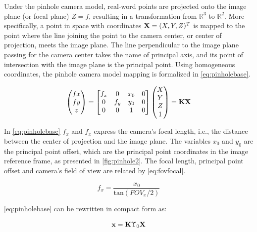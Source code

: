 Under the pinhole camera model, real-word points are projected onto the image plane (or focal plane) $Z = f$, resulting in a transformation from $\mathbb{R}^3$ to $\mathbb{R}^2$. More specifically, a point in space with coordinates $\mathrm{\textbf{X}} = (X,Y,Z)^T$ is mapped to the point where the line joining the point to the camera center, or center of projection, meets the image plane. The line perpendicular to the image plane passing for the camera center takes the name of principal axis, and its point of intersection with the image plane is the principal point. Using homogeneous coordinates, the pinhole camera model mapping is formalized in \cref{eq:pinholebase}.

\begin{equation}
\label{eq:pinholebase}
    \begin{pmatrix}
        fx\\
        fy\\
        z
    \end{pmatrix}=\begin{bmatrix}
    f_x & 0 & x_0 & 0 \\ 0 & f_y & y_0 & 0 \\ 0 & 0 & 1 & 0
    \end{bmatrix}\begin{pmatrix}
        X \\ Y \\ Z \\ 1
    \end{pmatrix} = \mathrm{\textbf{K}}\mathrm{\textbf{X}}
\end{equation}

In \cref{eq:pinholebase} $f_x$ and $f_x$ express the camera's focal length, i.e., the distance between the center of projection and the image plane. The variables $x_0$ and $y_0$ are the principal point offset, which are the principal point coordinates in the image reference frame, as presented in \cref{fig:pinhole2}. The focal length, principal point offset and camera's field of view are related by \cref{eq:fovfocal}.

\begin{equation}
\label{eq:fovfocal}
    f_x = \frac{x_0}{\mathrm{tan}(FOV_x / 2)}
\end{equation}

\cref{eq:pinholebase} can be rewritten in compact form as:

\begin{equation}
\label{eq:pinhole2}
    \mathrm{\textbf{x}} = \mathrm{\textbf{K}}\Upsilon_0 \mathrm{\textbf{X}}
\end{equation}


